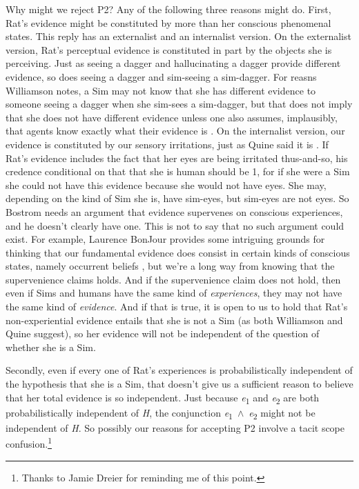 Why might we reject P2? Any of the following three reasons might do. First, Rat's evidence might be constituted by more than her conscious phenomenal states. This reply has an externalist and an internalist version. On the externalist version, Rat's perceptual evidence is constituted in part by the objects she is perceiving. Just as seeing a dagger and hallucinating a dagger provide different evidence, so does seeing a dagger and sim-seeing a sim-dagger. For reasns Williamson notes, a Sim may not know that she has different evidence to someone seeing a dagger when she sim-sees a sim-dagger, but that does not imply that she does not have different evidence unless one also assumes, implausibly, that agents know exactly what their evidence is \citet{Williamson2000-WILSAE-2}. On the internalist version, our evidence is constituted by our sensory irritations, just as Quine said it is \citep{Quine1973}. If Rat's evidence includes the fact that her eyes are being irritated thus-and-so, his credence conditional on that that she is human should be 1, for if she were a Sim she could not have this evidence because she would not have eyes. She may, depending on the kind of Sim she is, have sim-eyes, but sim-eyes are not eyes. So Bostrom needs an argument that evidence supervenes on conscious experiences, and he doesn't clearly have one. This is not to say that no such argument could exist. For example, Laurence BonJour provides some intriguing grounds for thinking that our fundamental evidence does consist in certain kinds of conscious states, namely occurrent beliefs \citep{BonJour1999}, but we're a long way from knowing that the supervenience claims holds. And if the supervenience claim does not hold, then even if Sims and humans have the same kind of \textit{experiences}, they may not have the same kind of \textit{evidence}. And if that is true, it is open to us to hold that Rat's non-experiential evidence entails that she is not a Sim (as both Williamson and Quine suggest), so her evidence will not be independent of the question of whether she is a Sim.

Secondly, even if every one of Rat's experiences is probabilistically independent of the hypothesis that she is a Sim, that doesn't give us a sufficient reason to believe that her total evidence is so independent. Just because \textit{e}\textsubscript{1} and \textit{e}\textsubscript{2} are both probabilistically independent of \textit{H}, the conjunction \textit{e}\textsubscript{1}~${\wedge}$~\textit{e}\textsubscript{2} might not be independent of \textit{H}. So possibly our reasons for accepting P2 involve a tacit scope confusion.\footnote{ Thanks to Jamie Dreier for reminding me of this point.}

